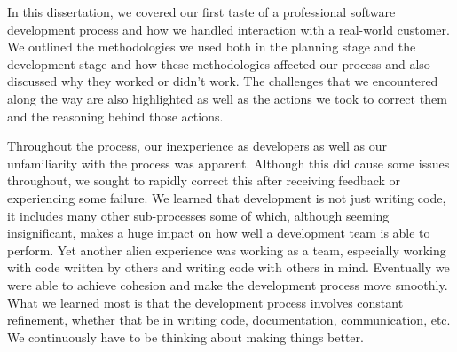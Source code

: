 \documentclass{l3proj}
\begin{document}
In this dissertation, we covered our first taste of a professional software development process and how we handled interaction with a real-world customer. We outlined the methodologies we used both in the planning stage and the development stage and how these methodologies affected our process and also discussed why they worked or didn't work. The challenges that we encountered along the way are also highlighted as well as the actions we took to correct them and the reasoning behind those actions.

Throughout the process, our inexperience as developers as well as our unfamiliarity with the process was apparent. Although this did cause some issues throughout, we sought to rapidly correct this after receiving feedback or experiencing some failure. We learned that development is not just writing code, it includes many other sub-processes some of which, although seeming insignificant, makes a huge impact on how well a development team is able to perform. Yet another alien experience was working as a team, especially working with code written by others and writing code with others in mind. Eventually we were able to achieve cohesion and make the development process move smoothly. What we learned most is that the development process involves constant refinement, whether that be in writing code, documentation, communication, etc. We continuously have to be thinking about making things better. 



\end{document}
